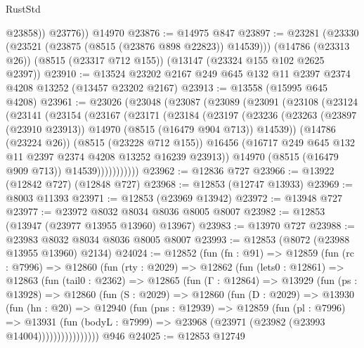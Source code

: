\begin{lexlean}{RustStd}
\begin{coremodule}
            @23858))
        @23776))
    @14970
@23876 := @14975 @847
@23897 := @23281
    (@23330 (@23521 (@23875 (@8515 (@23876 @898 @22823)) @14539)))
    (@14786 (@23313 @26))
    (@8515 (@23317 @712 @155))
    (@13147 (@23324 @155 @102 @2625 @2397))
@23910 := @13524 @23202 @2167 @249 @645 @132 @11 @2397 @2374 @4208 @13252 (@13457 @23202 @2167)
@23913 := @13558 (@15995 @645 @4208)
@23961 := @23026
    (@23048
      (@23087
        (@23089
          (@23091
            (@23108
              (@23124
                (@23141
                  (@23154
                    (@23167
                      (@23171
                        (@23184
                          (@23197
                            (@23236
                              (@23263
                                (@23897 (@23910 @23913))
                                @14970
                                (@8515 (@16479 @904 @713))
                                @14539))
                            (@14786 (@23224 @26))
                            (@8515 (@23228 @712 @155))
                            @16456
                            (@16717 @249 @645 @132 @11 @2397 @2374 @4208 @13252 @16239 @23913))
                          @14970
                          (@8515 (@16479 @909 @713))
                          @14539)))))))))))
@23962 := @12836 @727
@23966 := @13922 (@12842 @727) (@12848 @727)
@23968 := @12853 (@12747 @13933)
@23969 := @8003 @11393
@23971 := @12853 (@23969 @13942)
@23972 := @13948 @727
@23977 := @23972 @8032 @8034 @8036 @8005 @8007
@23982 := @12853 (@13947 (@23977 @13955 @13960) @13967)
@23983 := @13970 @727
@23988 := @23983 @8032 @8034 @8036 @8005 @8007
@23993 := @12853 (@8072 (@23988 @13955 @13960) @2134)
@24024 := @12852
    (fun (fn : @91) =>
    @12859
      (fun (rc : @7996) =>
      @12860
        (fun (rty : @2029) =>
        @12862
          (fun (lets0 : @12861) =>
          @12863
            (fun (tail0 : @2362) =>
            @12865
              (fun (Γ : @12864) =>
              @13929
                (fun (ps : @13928) =>
                @12860
                  (fun (S : @2029) =>
                  @12860
                    (fun (D : @2029) =>
                    @13930
                      (fun (hn : @20) =>
                      @12940
                        (fun (pns : @12939) =>
                        @12859
                          (fun (pl : @7996) =>
                          @13931
                            (fun (bodyL : @7999) =>
                            @23968 (@23971 (@23982 (@23993 @14004))))))))))))))))
    @946
@24025 := @12853 @12749

\end{coremodule}
\end{lexlean}
